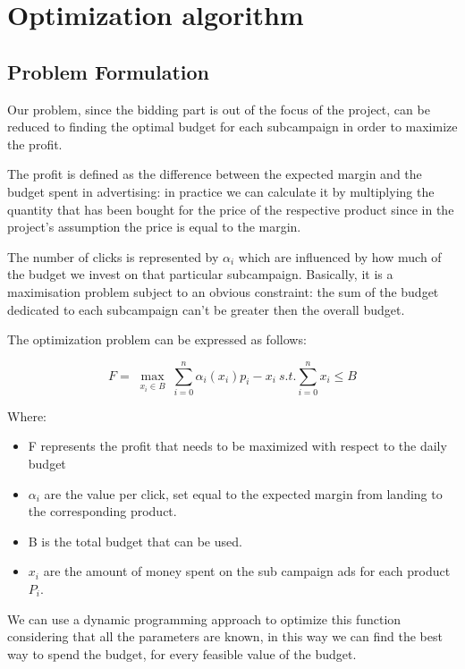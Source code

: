 \chapter{Optimization algorithm}
\label{chap:opt_alg}

\section{Problem Formulation}
\label{sec:Opt_Problem Formulation}
Our problem, since the bidding part is out of the focus of the project, can be reduced to finding the optimal budget for each subcampaign in order to maximize the profit.

The profit is defined as the difference between the expected margin and the budget spent in advertising: in practice we can calculate it by multiplying the quantity that has been bought for the price of the respective product since in the project's assumption the price is equal to the margin.

The number of clicks is represented by $\alpha_i$ which are influenced by how much of the budget we invest on that particular subcampaign.
Basically, it is a maximisation problem subject to an obvious constraint: the sum of the budget dedicated to each subcampaign can’t be greater then the overall budget.

The optimization problem can be expressed as follows:

\begin{displaymath}
F=\max_{\substack{x_i \in B}} \sum_{i=0}^n \alpha_i(x_i)p_i-x_i \ s.t. \sum_{i=0}^n x_i\leq B
\end{displaymath}

Where:

\begin{itemize}
    \item F represents the profit that needs to be maximized with respect to the daily budget
    \item $\alpha_i$ are the value per click, set equal to the expected margin from landing to the corresponding product.
    \item B is the total budget that can be used.
    \item $x_i$ are the amount of money spent on the sub campaign ads for each product $P_i$.
\end{itemize}

We can use a dynamic programming approach to optimize this function considering that all the parameters are known, in this way we can find the best way to spend the budget, for every feasible value of the budget.

